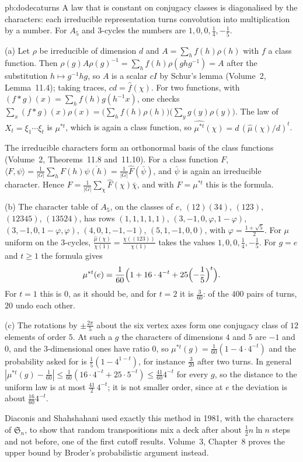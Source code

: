 \begin{solution}{pb:dodecaturns}
\idea A law that is constant on conjugacy classes is diagonalised by the characters: each irreducible representation turns convolution into
multiplication by a number. For $A_5$ and $3$-cycles the numbers are $1,0,0,\frac14,-\frac15$.

\writeup (a) Let $\rho$ be irreducible of dimension $d$ and $A=\sum_hf(h)\rho(h)$ with $f$ a class function. Then $\rho(g)A\rho(g)^{-1}=\sum_hf(h)\rho(ghg^{-1})=A$ after the
substitution $h\mapsto g^{-1}hg$, so $A$ is a scalar $cI$ by Schur's lemma (Volume~2, Lemma~11.4); taking traces, $cd=\hat f(\chi)$. For two functions, with
$(f*g)(x)=\sum_hf(h)g(h^{-1}x)$, one checks $\sum_x(f*g)(x)\rho(x)=\bigl(\sum_hf(h)\rho(h)\bigr)\bigl(\sum_yg(y)\rho(y)\bigr)$. The law of $X_t=\xi_1\cdots\xi_t$ is $\mu^{*t}$, which is again a
class function, so $\widehat{\mu^{*t}}(\chi)=d\,(\hat\mu(\chi)/d)^t$.

The irreducible characters form an orthonormal basis of the class functions (Volume~2, Theorems~11.8 and~11.10). For a class function $F$,
$\langle F,\psi\rangle=\frac1{|G|}\sum_hF(h)\overline{\psi(h)}=\frac1{|G|}\hat F(\bar\psi)$, and $\bar\psi$ is again an irreducible character. Hence
$F=\frac1{|G|}\sum_\chi\hat F(\chi)\bar\chi$, and with $F=\mu^{*t}$ this is the formula.

(b) The character table of $A_5$, on the classes of $e$, $(12)(34)$, $(123)$, $(12345)$, $(13524)$, has rows $(1,1,1,1,1)$, $(3,-1,0,\varphi,1-\varphi)$,
$(3,-1,0,1-\varphi,\varphi)$, $(4,0,1,-1,-1)$, $(5,1,-1,0,0)$, with $\varphi=\frac{1+\sqrt5}2$. For $\mu$ uniform on the $3$-cycles, $\frac{\hat\mu(\chi)}{\chi(1)}=\frac{\chi((123))}{\chi(1)}$ takes the values $1,0,0,\frac14,-\frac15$. For $g=e$
and $t\ge1$ the formula gives
\[
\mu^{*t}(e)=\frac1{60}\Bigl(1+16\cdot4^{-t}+25\Bigl(-\frac15\Bigr)^t\Bigr).
\]
For $t=1$ this is $0$, as it should be, and for $t=2$ it is $\frac3{60}$: of the $400$ pairs of turns, $20$ undo each other.

(c) The rotations by $\pm\frac{2\pi}5$ about the six vertex axes form one conjugacy class of $12$ elements of order $5$. At such a $g$ the characters of
dimensions $4$ and $5$ are $-1$ and $0$, and the $3$-dimensional ones have ratio $0$, so $\mu^{*t}(g)=\frac1{60}(1-4\cdot4^{-t})$ and the probability asked for is
$\frac15(1-4^{1-t})$, for instance $\frac3{20}$ after two turns. In general $|\mu^{*t}(g)-\frac1{60}|\le\frac1{60}(16\cdot4^{-t}+25\cdot5^{-t})\le\frac{41}{60}4^{-t}$ for every $g$, so the distance to the uniform
law is at most $\frac{41}2\,4^{-t}$; it is not smaller order, since at $e$ the deviation is about $\frac{16}{60}4^{-t}$.

\leads Diaconis and Shahshahani used exactly this method in 1981, with the characters of $\mathfrak S_n$, to show that random transpositions mix a deck
after about $\frac12n\ln n$ steps and not before, one of the first cutoff results. Volume~3, Chapter~8 proves the upper bound by Broder's
probabilistic argument instead.
\end{solution}

